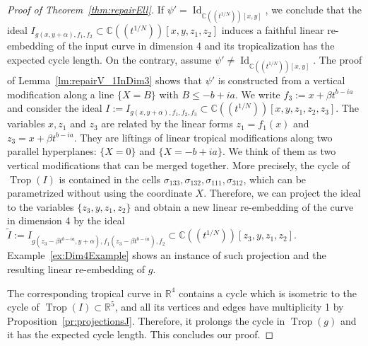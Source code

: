 \documentclass[11pt]{amsart}
\numberwithin{equation}{section}
\theoremstyle{plain}
\theoremstyle{definition}
\theoremstyle{remark}
\begin{document}
\begin{proof} [Proof of Theorem~\ref{thm:repairEll}]
 If $\psi'=\operatorname{Id}_{{{\mathbb{C}}(\!(t^{1/N})\!)}[x,y]}$, we conclude that the ideal
 $I_{g(x,y+\alpha), f_{1}, f_2}\subset {{\mathbb{C}}(\!(t^{1/N})\!)}[x,y,z_{1},z_2]$ induces a
 faithful linear re-embedding of the input curve in dimension 4 and
 its tropicalization has the expected cycle length.  On the contrary,
 assume $\psi'\neq \operatorname{Id}_{{{\mathbb{C}}(\!(t^{1/N})\!)}[x,y]}$.  The proof of
 Lemma~\ref{lm:repairV_1InDim3} shows that $\psi'$ is constructed from
 a vertical modification along a line $\{X=B\}$ with $B\leq -b+ia$.
 We write $f_3:=x+\beta t^{b-ia}$ and consider the ideal
 $I:=I_{g(x,y+\alpha), f_{1}, f_2,f_3}\subset
 {{\mathbb{C}}(\!(t^{1/N})\!)}[x,y,z_{1},z_2,z_3]$. The variables $x,z_{1}$ and $z_3$ are
 related by the linear forms $z_1=f_{1}(x)$ and $z_3=x+\beta
 t^{b-ia}$. They are liftings of linear tropical modifications along
 two parallel hyperplanes: $\{X=0\}$ and $\{X=-b+ia\}$. We think of
 them as two vertical modifications that can be merged together. More
 precisely, the cycle of $\operatorname{Trop}(I)$ is contained in the cells
 $\sigma_{133}, \sigma_{132}, \sigma_{111}, \sigma_{312}$, which can
 be parametrized without using the coordinate $X$. Therefore, we can
 project the ideal to the variables $\{z_3,y,z_{1},z_2\}$ and obtain a
 new linear re-embedding of the curve in dimension 4 by the ideal
 $\tilde{I}:=I_{g(z_3-\beta t^{b-ia},y+\alpha), {f}_{1}(z_3-\beta
   t^{b-ia}),
   f_2}
 \subset {{\mathbb{C}}(\!(t^{1/N})\!)}[z_3,y,z_{1},z_2]$. Example~\ref{ex:Dim4Example} shows an
 instance of such projection and the resulting linear re-embedding of
 $g$.

The corresponding tropical curve in ${\mathbb{R}}^4$ contains a cycle which is
isometric to the cycle of $\operatorname{Trop}(I)\subset {\mathbb{R}}^5$, and all its
vertices and edges have multiplicity 1 by
Proposition~\ref{pr:projectionsJ}. Therefore, it prolongs the cycle in
$\operatorname{Trop}(g)$ and it has the expected cycle length. This concludes our
proof.

\end{proof}

 
\end{document}
